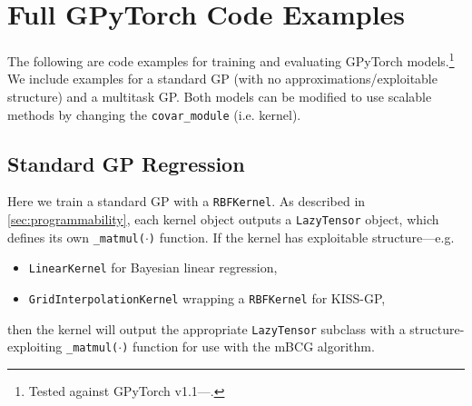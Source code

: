 \chapter{Full GPyTorch Code Examples}

The following are code examples for training and evaluating GPyTorch models.\footnote{
  Tested against GPyTorch v1.1---.
}
We include examples for a standard GP (with no approximations/exploitable structure) and a multitask GP.
Both models can be modified to use scalable methods by changing the {\tt covar\_module} (i.e. kernel).



\section{Standard GP Regression}
\label{app:standard_gp_example}

Here we train a standard GP with a {\tt RBFKernel}.
As described in \cref{sec:programmability}, each kernel object outputs a {\tt LazyTensor} object, which defines its own {\tt \_matmul($\cdot$)} function.
If the kernel has exploitable structure---e.g.
%
\begin{itemize}
  \item {\tt LinearKernel} for Bayesian linear regression,
  \item {\tt GridInterpolationKernel} wrapping a {\tt RBFKernel} for KISS-GP,
\end{itemize}
%
then the kernel will output the appropriate {\tt LazyTensor} subclass with a structure-exploiting {\tt \_matmul($\cdot$)} function for use with the mBCG algorithm.


